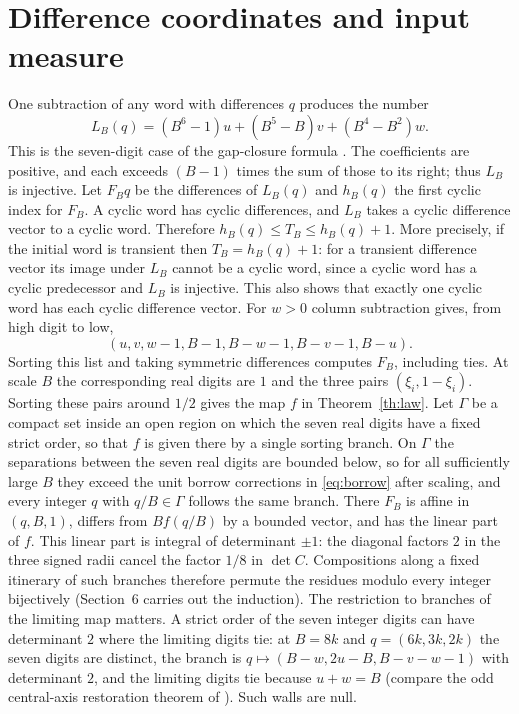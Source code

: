 \documentclass[11pt,reqno]{amsart}
\begin{document}
\section{Difference coordinates and input measure}
One subtraction of any word with differences $q$ produces the number
\[
 L_B(q)=(B^6-1)u+(B^5-B)v+(B^4-B^2)w .
\]
This is the seven-digit case of the gap-closure formula \cite[\S2]{Kah}.
The coefficients are positive, and each exceeds $(B-1)$ times the sum
of those to its right; thus $L_B$ is injective. Let $F_Bq$ be the differences
of $L_B(q)$ and $h_B(q)$ the first cyclic index for $F_B$. A cyclic word
has cyclic differences, and $L_B$ takes a cyclic difference vector to a
cyclic word. Therefore $h_B(q)\le T_B\le h_B(q)+1$.
More precisely, if the initial word is transient then $T_B=h_B(q)+1$:
for a transient difference vector its image under $L_B$ cannot be a
cyclic word, since a cyclic word has a cyclic predecessor and $L_B$ is
injective. This also shows that exactly one cyclic word has each cyclic
difference vector.
For $w>0$ column subtraction gives, from high digit to low,
\begin{equation}\label{eq:borrow}
 (u,v,w-1,B-1,B-w-1,B-v-1,B-u).
\end{equation}
Sorting this list and taking symmetric differences computes $F_B$,
including ties. At scale $B$ the corresponding real digits are $1$ and
the three pairs $(\xi_i,1-\xi_i)$. Sorting these pairs around $1/2$
gives the map $f$ in Theorem~\ref{th:law}. Let $\Gamma$ be a compact set
inside an open region on which the seven real digits have a fixed strict
order, so that $f$ is given there by a single sorting branch. On
$\Gamma$ the separations between the seven real digits are bounded below, so
for all sufficiently large $B$ they exceed the unit borrow corrections in
\eqref{eq:borrow} after scaling, and every integer $q$ with $q/B\in\Gamma$
follows the same branch. There $F_B$ is affine in $(q,B,1)$, differs from
$Bf(q/B)$ by a bounded vector, and has the linear part of $f$. This linear
part is integral of determinant $\pm1$: the diagonal factors $2$ in the
three signed radii cancel the factor $1/8$ in $\det C$. Compositions along
a fixed itinerary of such branches therefore permute the residues modulo
every integer bijectively (Section~6 carries out the induction). The
restriction to branches of the limiting map matters. A strict order of
the seven integer digits can have determinant $2$ where the limiting digits
tie: at $B=8k$ and $q=(6k,3k,2k)$ the seven digits are distinct, the branch is
$q\mapsto(B-w,2u-B,B-v-w-1)$ with determinant $2$, and the limiting
digits tie because $u+w=B$ (compare the odd central-axis restoration
theorem of \cite[\S5]{Kah}). Such walls are null.
\end{document}
